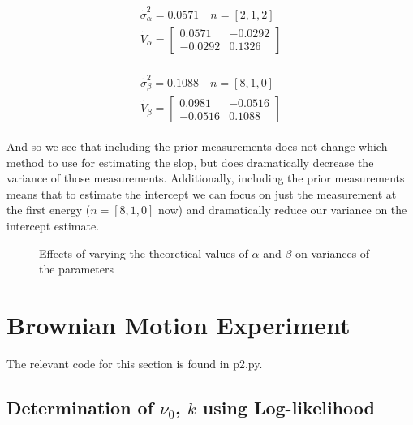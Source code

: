 \documentclass[paper=a4, fontsize=11pt]{scrartcl} %
\numberwithin{equation}{section} %
\numberwithin{figure}{section} %
\numberwithin{table}{section} %
\numberwithin{equation}{subsection}
\begin{document}
\begin{align}
\begin{split}
\tilde{\sigma}_\alpha^2 = 0.0571 \quad n = [2, 1, 2] 
\\ \tilde{V}_\alpha = \left[\begin{matrix}
0.0571 & -0.0292
\\-0.0292 & 0.1326
\end{matrix}\right]
\end{split}
\end{align}

\begin{align}
\begin{split}
\tilde{\sigma}_\beta^2 = 0.1088 \quad n = [8, 1, 0] 
\\ \tilde{V}_\beta = \left[\begin{matrix}
0.0981 & -0.0516
\\-0.0516 & 0.1088
\end{matrix}\right]
\end{split}
\end{align}

And so we see that including the prior measurements does not change which method to use for estimating the slop, but does dramatically decrease the variance of those measurements. Additionally, including the prior measurements means that to estimate the intercept we can focus on just the measurement at the first energy ($n = [8,1,0]$ now) and dramatically reduce our variance on the intercept estimate.



\begin{figure}
\caption{Effects of varying the theoretical values of $\alpha$ and $\beta$ on variances of the parameters}
\end{figure}



\section{Brownian Motion Experiment}

The relevant code for this section is found in p2.py.

\subsection{Determination of $\nu_0$, $k$ using Log-likelihood} \label{loglike}
\end{document}
